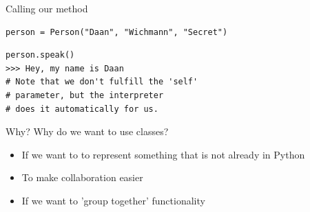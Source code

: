 \begin{frame}[fragile]{Calling our method}
\pause
\begin{verbatim}
person = Person("Daan", "Wichmann", "Secret")
\end{verbatim}
\pause
\begin{verbatim}
person.speak()
>>> Hey, my name is Daan
# Note that we don't fulfill the 'self' 
# parameter, but the interpreter
# does it automatically for us.
\end{verbatim}
\end{frame}

\begin{frame}{Why?}
Why do we want to use classes?
\begin{itemize}
    \item If we want to to represent something that is not already in Python
    \item To make collaboration easier
    \item If we want to 'group together' functionality
\end{itemize}
\end{frame}
